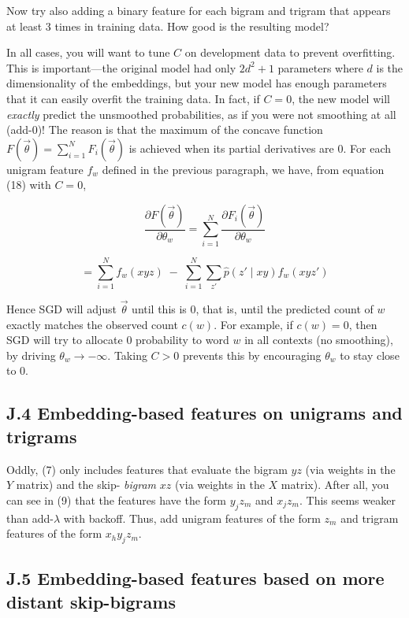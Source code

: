 Now try also adding a binary feature for each bigram and trigram that appears at least 3 times in training 
data. How good is the resulting model? 

In all cases, you will want to tune $C$ on development data to prevent overfitting. This is important—the 
original model had only $2d^2 + 1$ parameters where $d$ is the dimensionality of the embeddings, but your new 
model has enough parameters that it can easily overfit the training data. In fact, if $C = 0$, the new model 
will \emph{exactly} predict the unsmoothed probabilities, as if you were not smoothing at all (add-0)! The reason 
is that the maximum of the concave function $F(\vec{\theta}) = \sum_{i=1}^N F_i(\vec{\theta})$ is achieved when its partial derivatives 
are 0. For each unigram feature $f_w$ defined in the previous paragraph, we have, from equation (18) with 
$C = 0$, 

\[
\frac{\partial F(\vec{\theta})}{\partial \theta_w} = \sum_{i=1}^N \frac{\partial F_i(\vec{\theta})}{\partial \theta_w} \tag{28}
\]

\[
= \sum_{i=1}^N f_w(xyz) \;-\; \sum_{i=1}^N \sum_{z'} \hat{p}(z' \mid xy) f_w(xyz') \tag{29}
\]

Hence SGD will adjust $\vec{\theta}$ until this is 0, that is, until the predicted count of $w$ exactly matches the observed 
count $c(w)$. For example, if $c(w) = 0$, then SGD will try to allocate 0 probability to word $w$ in all contexts 
(no smoothing), by driving $\theta_w \to -\infty$. Taking $C > 0$ prevents this by encouraging $\theta_w$ to stay close to 0. 

\subsection*{J.4 Embedding-based features on unigrams and trigrams}

Oddly, (7) only includes features that evaluate the bigram $yz$ (via weights in the $Y$ matrix) and the skip-
\emph{bigram} $xz$ (via weights in the $X$ matrix). After all, you can see in (9) that the features have the form $y_j z_m$ 
and $x_j z_m$. This seems weaker than add-$\lambda$ with backoff. Thus, add unigram features of the form $z_m$ and 
trigram features of the form $x_h y_j z_m$. 

\subsection*{J.5 Embedding-based features based on more distant skip-bigrams}

